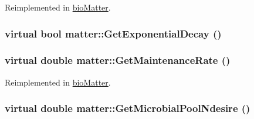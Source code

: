 Reimplemented in \hyperlink{classbio_matter_aee0b5cbabdff3103df0fb634c131a8a1}{bioMatter}.\hypertarget{classmatter_a2795dedbc608b20bc713a17981e181af}{
\subsubsection[{GetExponentialDecay}]{\setlength{\rightskip}{0pt plus 5cm}virtual bool matter::GetExponentialDecay ()}}
\label{classmatter_a2795dedbc608b20bc713a17981e181af}
\hypertarget{classmatter_addcaacf93fd6c24eceada787a2bac3fe}{
\subsubsection[{GetMaintenanceRate}]{\setlength{\rightskip}{0pt plus 5cm}virtual double matter::GetMaintenanceRate ()}}
\label{classmatter_addcaacf93fd6c24eceada787a2bac3fe}


Reimplemented in \hyperlink{classbio_matter_af20366c312adfce4ae986a512043cfe7}{bioMatter}.\hypertarget{classmatter_a1af8fc74ce3aed8d761a4a3cd0b98ca0}{
\subsubsection[{GetMicrobialPoolNdesire}]{\setlength{\rightskip}{0pt plus 5cm}virtual double matter::GetMicrobialPoolNdesire ()}}
\label{classmatter_a1af8fc74ce3aed8d761a4a3cd0b98ca0}



